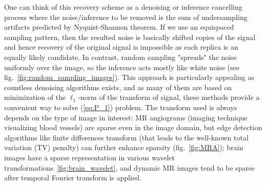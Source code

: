 One can think of this recovery scheme as a denoising or inference cancelling process where the noise/inference to be removed is the sum of undersampling artifacts predicted by Nyquist-Shannon theorem. If we use an equispaced sampling pattern, then the resulted noise is basically shifted copies of the signal and hence recovery of the original signal is impossible as each replica is an equally likely candidate. In contrast, random sampling "spreads" the noise uniformly over the image, so the inference acts mostly like white noise (see fig.~\ref{fig:random_sampling_images}). This approach is particularly appealing as countless denoising algorithms exists, and as many of them are based on minimization of the $\ell_1$-norm of the transform of signal, these methods provide a convenient way to solve (\ref{eq:P_1}) problem. The transform used is always depends on the type of image in interest: MR angiograms (imaging technique visualizing blood vessels) are sparse even in the image domain, but edge detection algorithms like finite differences transform (that leads to the well-known total variation (TV) penalty) can further enhance sparsity (fig.~\ref{fig:MRA}); brain images have a sparse representation in various wavelet transformations~\ref{fig:brain_wavelet}, and dynamic MR images tend to be sparse after temporal Fourier transform is applied.

